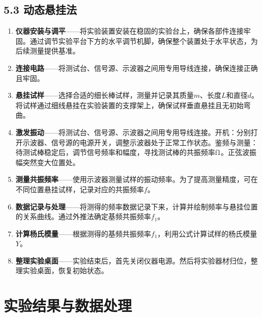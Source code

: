 \documentclass[11pt]{article}
\begin{document}
\subsection*{5.3 动态悬挂法}
\begin{enumerate}
\item \textbf{仪器安装与调平}——将实验装置安装在稳固的实验台上，确保各部件连接牢固。通过调节实验平台下方的水平调节机脚，确保整个装置处于水平状态，为后续测量提供基准。
\item \textbf{连接电路}——将测试台、信号源、示波器之间用专用导线连接，确保连接正确且牢固。
\item \textbf{悬挂试样}——选择合适的细长棒试样，测量并记录其质量$m$、长度$L$和直径$d$。将试样通过细线悬挂在实验装置的支撑架上，确保试样垂直悬挂且无初始弯曲。
\item \textbf{激发振动}——将测试台、信号源、示波器之间用专用导线连接。开机：分别打开示波器、信号源的电源开关，调整示波器处于正常工作状态。鉴频与测量：待测试棒稳定后，调节信号频率和幅度，寻找测试棒的共振频率f1。正弦波振幅突然变大位置处。
\item \textbf{测量共振频率}——使用示波器测量试样的振动频率。为了提高测量精度，可在不同位置悬挂试样，记录对应的共振频率$f$。
\item \textbf{数据记录与处理}——将测得的频率数据记录下来，计算并绘制频率与悬挂位置的关系曲线。通过外推法确定基频共振频率$f_1$。
\item \textbf{计算杨氏模量}——根据测得的基频共振频率$f_1$，利用公式计算试样的杨氏模量$Y$。
\item \textbf{整理实验桌面}——实验结束后，首先关闭仪器电源。然后将实验器材归位，整理实验桌面，恢复初始状态。
\end{enumerate}

\section{实验结果与数据处理}
\end{document}
